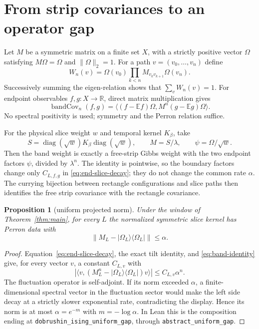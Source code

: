 \documentclass[11pt]{article}
\newtheorem{proposition}[theorem]{Proposition}
\theoremstyle{definition}
\theoremstyle{remark}
\newcommand{\R}{\mathbb{R}}
\newcommand{\diag}{\operatorname{diag}}
\newcommand{\lean}[1]{\nolinkurl{#1}}
\begin{document}
\section{From strip covariances to an operator gap}
\label{sec:transport}

Let $M$ be a symmetric matrix on a finite set $X$, with a strictly positive
vector $\Omega$ satisfying $M\Omega=\Omega$ and $\|\Omega\|_2=1$.  For a path
$v=(v_0,\ldots,v_n)$ define
\[
  W_n(v)=\Omega(v_0)\prod_{k<n}M_{v_kv_{k+1}}\Omega(v_n).
\]
Successively summing the eigen-relation shows that $\sum_vW_n(v)=1$.  For
endpoint observables $f,g:X\to\R$, direct matrix multiplication gives
\begin{equation}
\label{eq:band-identity}
  \operatorname{bandCov}_n(f,g)
  =\langle(f-\mathbb Ef)\Omega,
      M^n(g-\mathbb Eg)\Omega\rangle.
\end{equation}
No spectral positivity is used; symmetry and the Perron relation suffice.

For the physical slice weight $w$ and temporal kernel $K_\beta$, take
\[
  S=\diag(\sqrt w)K_\beta\diag(\sqrt w),
  \qquad M=S/\lambda,
  \qquad \psi=\Omega/\sqrt w.
\]
Then the band weight is exactly a free-strip Gibbs weight with the two endpoint
factors $\psi$, divided by $\lambda^n$.  The identity is pointwise, so the
boundary factors change only $C_{L,f,g}$ in
\eqref{eq:end-slice-decay}; they do not change the common rate $\alpha$.
The currying bijection between rectangle configurations and slice paths then
identifies the free strip covariance with the rectangle covariance.

\begin{proposition}[uniform projected norm]
\label{prop:gap}
Under the window of Theorem~\ref{thm:main}, for every $L$ the normalized
symmetric slice kernel has Perron data with
\[
  \|M_L-|\Omega_L\rangle\langle\Omega_L|\|\leq\alpha.
\]
\end{proposition}

\begin{proof}
Equation~\eqref{eq:end-slice-decay}, the exact tilt identity, and
\eqref{eq:band-identity} give, for every vector $v$, a constant $C_{L,v}$ with
\[
  |\langle v,(M_L^n-|\Omega_L\rangle\langle\Omega_L|)v\rangle|
  \leq C_{L,v}\alpha^n.
\]
The fluctuation operator is self-adjoint.  If its norm exceeded $\alpha$, a
finite-dimensional spectral vector in the fluctuation sector would make the
left side decay at a strictly slower exponential rate, contradicting the
display.  Hence its norm is at most $\alpha=e^{-m}$ with
$m=-\log\alpha$.  In Lean this is the composition ending at
\lean{dobrushin\_ising\_uniform\_gap}, through
\lean{abstract\_uniform\_gap}.
\end{proof}
\end{document}
